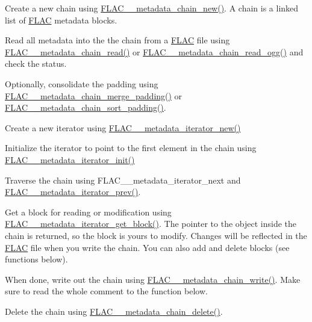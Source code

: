 \begin{DoxyItemize}
\item Create a new chain using \hyperlink{group__flac__metadata__level2_gafd1f4f58af29325b067ebc5dc34a0f69}{F\+L\+A\+C\+\_\+\+\_\+metadata\+\_\+chain\+\_\+new()}. A chain is a linked list of \hyperlink{namespace_f_l_a_c}{F\+L\+AC} metadata blocks.
\item Read all metadata into the the chain from a \hyperlink{namespace_f_l_a_c}{F\+L\+AC} file using \hyperlink{group__flac__metadata__level2_gadb7d8e9a82aeb43e256f0a948adf5c45}{F\+L\+A\+C\+\_\+\+\_\+metadata\+\_\+chain\+\_\+read()} or \hyperlink{group__flac__metadata__level2_gae7b34f2929bedea0e14ac14aca253a40}{F\+L\+A\+C\+\_\+\+\_\+metadata\+\_\+chain\+\_\+read\+\_\+ogg()} and check the status.
\item Optionally, consolidate the padding using \hyperlink{group__flac__metadata__level2_gab24934bc1f0e054c631a22c9b9221f3e}{F\+L\+A\+C\+\_\+\+\_\+metadata\+\_\+chain\+\_\+merge\+\_\+padding()} or \hyperlink{group__flac__metadata__level2_gaa14304da1c8e706808cfafa5cbbf575b}{F\+L\+A\+C\+\_\+\+\_\+metadata\+\_\+chain\+\_\+sort\+\_\+padding()}.
\item Create a new iterator using \hyperlink{group__flac__metadata__level2_gac988906d63bd2ddc910d8f0b118591f7}{F\+L\+A\+C\+\_\+\+\_\+metadata\+\_\+iterator\+\_\+new()}
\item Initialize the iterator to point to the first element in the chain using \hyperlink{group__flac__metadata__level2_ga4a5af69a1f19436b02f738eb8c97c959}{F\+L\+A\+C\+\_\+\+\_\+metadata\+\_\+iterator\+\_\+init()}
\item Traverse the chain using F\+L\+A\+C\+\_\+\+\_\+metadata\+\_\+iterator\+\_\+next and \hyperlink{group__flac__metadata__level2_ga003373a88bea6cea2df32f110a95e912}{F\+L\+A\+C\+\_\+\+\_\+metadata\+\_\+iterator\+\_\+prev()}.
\item Get a block for reading or modification using \hyperlink{group__flac__metadata__level2_ga4a2b00a4312d178a9f55c2e2f8b08904}{F\+L\+A\+C\+\_\+\+\_\+metadata\+\_\+iterator\+\_\+get\+\_\+block()}. The pointer to the object inside the chain is returned, so the block is yours to modify. Changes will be reflected in the \hyperlink{namespace_f_l_a_c}{F\+L\+AC} file when you write the chain. You can also add and delete blocks (see functions below).
\item When done, write out the chain using \hyperlink{group__flac__metadata__level2_gaa15ead7230217de8e79f4af822cda490}{F\+L\+A\+C\+\_\+\+\_\+metadata\+\_\+chain\+\_\+write()}. Make sure to read the whole comment to the function below.
\item Delete the chain using \hyperlink{group__flac__metadata__level2_ga178898eef72ba9d569b1964fffcb4a8b}{F\+L\+A\+C\+\_\+\+\_\+metadata\+\_\+chain\+\_\+delete()}.
\end{DoxyItemize}

